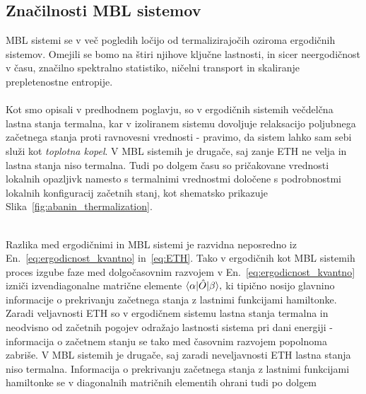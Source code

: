 \subsection{Značilnosti MBL sistemov } 
MBL sistemi se v več pogledih ločijo od termalizirajočih oziroma ergodičnih sistemov. Omejili se bomo na štiri njihove ključne lastnosti, in sicer neergodičnost v času, značilno spektralno statistiko, ničelni transport in skaliranje prepletenostne entropije. \\\\
Kot smo opisali v predhodnem poglavju, so v ergodičnih sistemih večdelčna lastna stanja termalna, kar v izoliranem sistemu dovoljuje relaksacijo poljubnega začetnega stanja proti ravnovesni vrednosti - pravimo, da sistem lahko sam sebi služi kot \emph{toplotna kopel}. V MBL sistemih je drugače, saj zanje ETH ne velja in lastna stanja niso termalna. Tudi po dolgem času so pričakovane vrednosti lokalnih opazljivk namesto s termalnimi vrednostmi določene s podrobnostmi lokalnih konfiguracij začetnih stanj, kot shematsko prikazuje Slika~\ref{fig:abanin_thermalization}.\\\\
\begin{minipage}[t]{0.44\textwidth}
\noindent 
Razlika med ergodičnimi in MBL sistemi je razvidna neposredno iz En.~\eqref{eq:ergodicnost_kvantno} in~\eqref{eq:ETH}. Tako v ergodičnih kot MBL sistemih proces izgube faze med dolgočasovnim razvojem v En.~\eqref{eq:ergodicnost_kvantno} izniči izvendiagonalne matrične elemente $\langle \alpha \vert\hat{O}\vert\beta\rangle,$ ki tipično nosijo glavnino informacije o prekrivanju začetnega stanja z lastnimi funkcijami hamiltonke. Zaradi veljavnosti ETH so v ergodičnem sistemu lastna stanja termalna in neodvisno od začetnih pogojev odražajo lastnosti sistema pri dani energiji - informacija o začetnem stanju se tako med časovnim razvojem popolnoma zabriše. V MBL sistemih je drugače, saj zaradi neveljavnosti ETH lastna stanja niso termalna. Informacija o prekrivanju začetnega stanja z lastnimi funkcijami hamiltonke se v diagonalnih matričnih elementih ohrani tudi po dolgem
\end{minipage}\hfill
